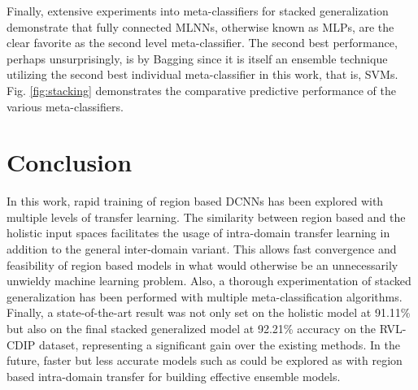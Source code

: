 \documentclass[10pt,conference,a4paper]{IEEEtran}
\begin{document}
Finally, extensive experiments into meta-classifiers for stacked generalization demonstrate that fully connected MLNNs, otherwise known as MLPs, are the clear favorite as the second level meta-classifier. The second best performance, perhaps unsurprisingly, is by Bagging since it is itself an ensemble technique utilizing the second best individual meta-classifier in this work, that is, SVMs. Fig. \ref{fig:stacking} demonstrates the comparative predictive performance of the various meta-classifiers.



\section{Conclusion}
In this work, rapid training of region based DCNNs has been explored with multiple levels of transfer learning. The similarity between region based and the holistic input spaces facilitates the usage of intra-domain transfer learning in addition to the general inter-domain variant. This allows fast convergence and feasibility of region based models in what would otherwise be an unnecessarily unwieldy machine learning problem. Also, a thorough experimentation of stacked generalization has been performed with multiple meta-classification algorithms. Finally, a state-of-the-art result was not only set on the holistic model at 91.11\% but also on the final stacked generalized model at 92.21\% accuracy on the RVL-CDIP dataset, representing a significant gain over the existing methods. In the future, faster but less accurate models such as \cite{afzal2017cutting} could be explored as with region based intra-domain transfer for building effective ensemble models.



\end{document}
